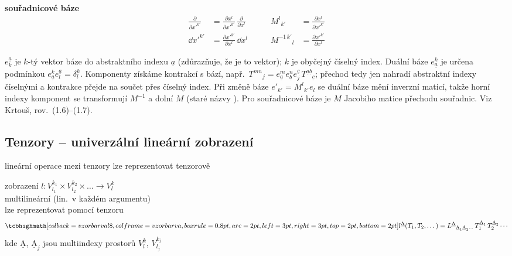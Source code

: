\textbf{souřadnicové báze}
\[
  \begin{aligned}
    \frac{\partial}{\partial x'^{k'}} &= \frac{\partial x^l}{\partial x'^{k'}}\,\frac{\partial}{\partial x^l}
      &\qquad M^l{}_{k'} &= \frac{\partial x^l}{\partial x'^{k'}} \\
    \dd x'^{k'} &= \frac{\partial x'^{k'}}{\partial x^l}\,\dd x^l
      &\qquad M^{-1\,k'}{}_l &= \frac{\partial x'^{k'}}{\partial x^l}
  \end{aligned}
\]

\begin{vysvetleni}
$e^{\underline a}_k$ je $k$-tý vektor báze  do abstraktního indexu $\underline a$ (zdůrazňuje, že je to vektor); $k$ je obyčejný číselný index. Duální báze $e^k_{\underline a}$ je určena podmínkou $e^k_{\underline a}e^{\underline a}_l=\delta^k_l$. Komponenty získáme kontrakcí s bází, např.\ $T^{mn}{}_{j}=e^m_{\underline a}e^n_{\underline b}e_j^{\underline c}\,T^{\underline a\underline b}{}_{\underline c}$; přechod  tedy jen nahradí abstraktní indexy číselnými a kontrakce přejde na součet přes číselný index. Při změně báze $e'_{k'}=M^l{}_{k'}e_l$ se duální báze mění inverzní maticí, takže horní indexy komponent se transformují $M^{-1}$ a dolní $M$ (staré názvy ). Pro souřadnicové báze je $M$ Jacobiho matice přechodu souřadnic. Viz Krtouš, rov.\ (1.6)--(1.7).
\end{vysvetleni}

\subsection{Tenzory -- univerzální lineární zobrazení}
\providecommand{\gmIpAA}{\underline{\mathrm{A}}}

lineární operace mezi tenzory lze reprezentovat tenzorově

\begin{veta}
zobrazení \quad $l: V^{k_1}_{l_1}\times V^{k_2}_{l_2}\times\dots\to V^k_l$ \\
\quad multilineární (lin.\ v každém argumentu) \\
\quad lze reprezentovat pomocí tenzoru
\[
  \vzorec{l^{\gmIpAA}(T_1,T_2,\dots) = L^{\gmIpAA}{}_{\gmIpAA_1\gmIpAA_2\dots}\,T_1^{\gmIpAA_1}\,T_2^{\gmIpAA_2}\cdots}
\]
\quad kde $\gmIpAA$, $\gmIpAA_j$ jsou multiindexy prostorů $V^k_l$, $V^{k_j}_{l_j}$
\end{veta}

